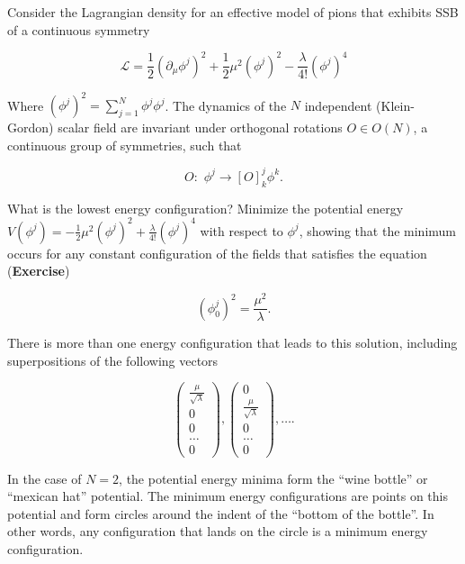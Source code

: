 \noindent Consider the Lagrangian density for an effective model of pions that exhibits SSB of a continuous symmetry

\begin{equation}
\mathcal{L} = \frac{1}{2}(\partial_\mu \phi^j )^2 + \frac{1}{2} \mu^2 (\phi^j)^2 - \frac{\lambda}{4!} (\phi^j)^4
\end{equation}

\noindent Where $(\phi^j)^2 = \sum_{j=1}^N \phi^j \phi^j$. The dynamics of the $N$ independent (Klein-Gordon) scalar field are invariant under orthogonal rotations $O \in O(N)$, a continuous group of symmetries, such that

\begin{equation}
O: \,\, \phi^j \rightarrow [O]^j_k \phi^k.
\end{equation}

\noindent What is the lowest energy configuration? Minimize the potential energy $V(\phi^j) = -\frac{1}{2} \mu^2 (\phi^j)^2 + \frac{\lambda}{4!} (\phi^j)^4$ with respect to $\phi^j$, showing that the minimum occurs for any constant configuration of the fields that satisfies the equation (\textbf{Exercise})

\begin{equation}
(\phi_0^j)^2 = \frac{\mu^2}{\lambda}. 
\end{equation}

\noindent There is more than one energy configuration that leads to this solution, including superpositions of the following vectors

\begin{equation}
\begin{pmatrix} \frac{\mu}{\sqrt{\lambda}} \\ 0 \\ 0 \\ \dots \\ 0 \end{pmatrix}, \begin{pmatrix} 0 \\\frac{\mu}{\sqrt{\lambda}} \\ 0 \\ \dots \\ 0 \end{pmatrix}, \dots .
\end{equation}

\noindent In the case of $N=2$, the potential energy minima form the ``wine bottle'' or ``mexican hat'' potential. The minimum energy configurations are points on this potential and form circles around the indent of the ``bottom of the bottle''. In other words, any configuration that lands on the circle is a minimum energy configuration.

